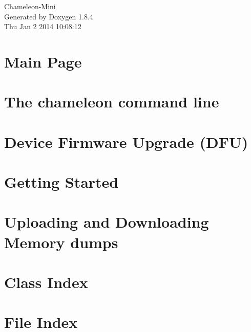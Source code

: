 \documentclass[twoside]{book}
\newcommand{\clearemptydoublepage}{%
  \newpage{\pagestyle{empty}\cleardoublepage}%
}
\begin{document}
\hypersetup{pageanchor=false}
\begin{titlepage}
\vspace*{7cm}
\begin{center}%
{\Large Chameleon-\/\-Mini }\\
\vspace*{1cm}
{\large Generated by Doxygen 1.8.4}\\
\vspace*{0.5cm}
{\small Thu Jan 2 2014 10:08:12}\\
\end{center}
\end{titlepage}
\clearemptydoublepage
\tableofcontents
\clearemptydoublepage
{}
\hypersetup{pageanchor=true}

\chapter{Main Page}
\label{index}\hypertarget{index}{}
\chapter{The chameleon command line}
\label{Page_CommandLine}
\hypertarget{Page_CommandLine}{}

\chapter{Device Firmware Upgrade (D\-F\-U)}
\label{Page_FirmwareUpgrade}
\hypertarget{Page_FirmwareUpgrade}{}

\chapter{Getting Started}
\label{Page_GettingStarted}
\hypertarget{Page_GettingStarted}{}

\chapter{Uploading and Downloading Memory dumps}
\label{Page_UploadingDownloading}
\hypertarget{Page_UploadingDownloading}{}

\chapter{Class Index}

\chapter{File Index}

\end{document}

